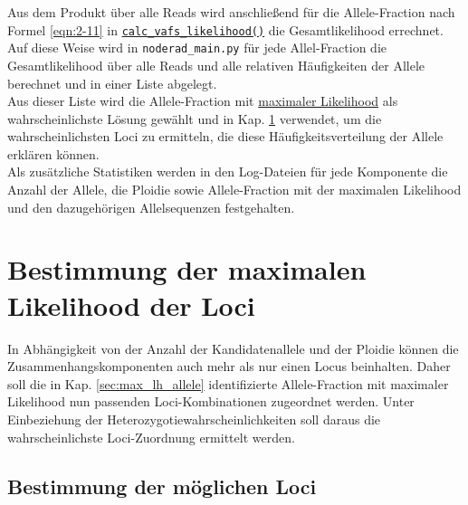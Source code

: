 Aus dem Produkt über alle Reads wird anschließend für die Allele-Fraction nach Formel \eqref{eqn:2-11} in \hyperref[schritt11]{\lstinline|calc_vafs_likelihood()|\label{schritt11txt}} die Gesamtlikelihood errechnet. \\

Auf diese Weise wird in \lstinline|noderad_main.py| für jede Allel-Fraction die Gesamtlikelihood über alle Reads und alle relativen Häufigkeiten der Allele berechnet und in einer Liste abgelegt. \\

Aus dieser Liste wird die Allele-Fraction mit \hyperref[schritt12]{maximaler Likelihood\label{schritt12txt}} als wahrscheinlichste Lösung gewählt und in Kap. \ref{sec:max_lh_loci} verwendet, um die wahrscheinlichsten Loci zu ermitteln, die diese Häufigkeitsverteilung der Allele erklären können.  \\

Als zusätzliche Statistiken werden in den Log-Dateien für jede Komponente die Anzahl der Allele, die Ploidie sowie Allele-Fraction mit der maximalen Likelihood und den dazugehörigen Allelsequenzen festgehalten.

\section{Bestimmung der maximalen Likelihood der Loci} \label{sec:max_lh_loci}

In Abhängigkeit von der Anzahl der Kandidatenallele und der Ploidie können die Zusammenhangskomponenten auch mehr als nur einen Locus beinhalten. Daher soll die in Kap. \ref{sec:max_lh_allele} identifizierte Allele-Fraction mit maximaler Likelihood nun passenden Loci-Kombinationen zugeordnet werden. Unter Einbeziehung der Heterozygotiewahrscheinlichkeiten soll daraus die wahrscheinlichste Loci-Zuordnung ermittelt werden.

\subsection{Bestimmung der möglichen Loci} \label{subsec:comb_loci}

